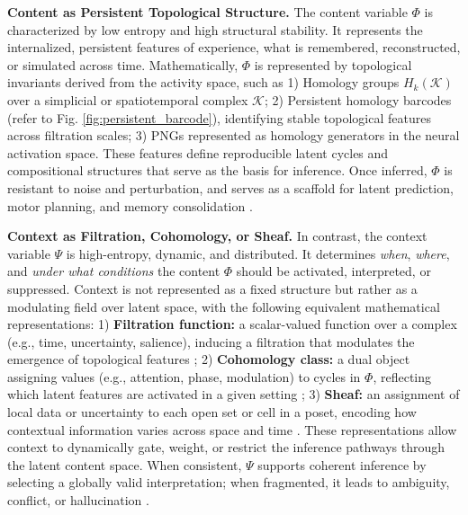 \documentclass[lettersize,journal]{IEEEtran}
\begin{document}
\noindent\textbf{Content as Persistent Topological Structure.}
The content variable \( \Phi \) is characterized by low entropy and high structural stability. It represents the internalized, persistent features of experience, what is remembered, reconstructed, or simulated across time. Mathematically, \( \Phi \) is represented by topological invariants derived from the activity space, such as 1) Homology groups \( H_k(\mathcal{K}) \) over a simplicial or spatiotemporal complex \( \mathcal{K} \); 2) Persistent homology barcodes (refer to Fig. \ref{fig:persistent_barcode}), identifying stable topological features across filtration scales; 3) PNGs represented as homology generators in the neural activation space.
These features define reproducible latent cycles and compositional structures that serve as the basis for inference. Once inferred, \( \Phi \) is resistant to noise and perturbation, and serves as a scaffold for latent prediction, motor planning, and memory consolidation \cite{petri2014homological}.

\noindent\textbf{Context as Filtration, Cohomology, or Sheaf.}
In contrast, the context variable \( \Psi \) is high-entropy, dynamic, and distributed. It determines \emph{when}, \emph{where}, and \emph{under what conditions} the content \( \Phi \) should be activated, interpreted, or suppressed. Context is not represented as a fixed structure but rather as a modulating field over latent space, with the following equivalent mathematical representations:
1) \textbf{Filtration function:} a scalar-valued function over a complex (e.g., time, uncertainty, salience), inducing a filtration that modulates the emergence of topological features \cite{bassett2017network}; 2) \textbf{Cohomology class:} a dual object assigning values (e.g., attention, phase, modulation) to cycles in \( \Phi \), reflecting which latent features are activated in a given setting \cite{bredon1997sheaf}; 3) \textbf{Sheaf:} an assignment of local data or uncertainty to each open set or cell in a poset, encoding how contextual information varies across space and time \cite{brown2020sheaf}.
These representations allow context to dynamically gate, weight, or restrict the inference pathways through the latent content space. When consistent, \( \Psi \) supports coherent inference by selecting a globally valid interpretation; when fragmented, it leads to ambiguity, conflict, or hallucination \cite{varela2017embodied}.
\end{document}
